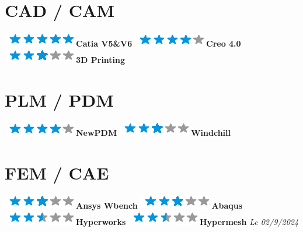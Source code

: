 \documentclass[]{friggeri-cv}
\begin{document}
\begin{aside}
\section{CAD / CAM}
\includegraphics[scale=0.40]{res/img/5stars.png}\hspace{1.5mm}\textbf{Catia V5\&V6}
\includegraphics[scale=0.40]{res/img/4stars.png}\hspace{1.5mm}\textbf{Creo 4.0}
\includegraphics[scale=0.40]{res/img/3stars.png}\hspace{1.5mm}\textbf{3D Printing}\section{PLM / PDM}
\includegraphics[scale=0.40]{res/img/4stars.png}\hspace{1.5mm}\textbf{NewPDM}
\includegraphics[scale=0.40]{res/img/3stars.png}\hspace{1.5mm}\textbf{Windchill}\section{FEM / CAE}
\includegraphics[scale=0.40]{res/img/3stars.png}\hspace{1.5mm}\textbf{Ansys Wbench}
\includegraphics[scale=0.40]{res/img/3stars.png}\hspace{1.5mm}\textbf{Abaqus}
\includegraphics[scale=0.40]{res/img/2-5stars.png}\hspace{1.5mm}\textbf{Hyperworks}
\includegraphics[scale=0.40]{res/img/2-5stars.png}\hspace{1.5mm}\textbf{Hypermesh}
\vspace{2.5mm}%
	\emph{Le 02/9/2024} \hspace*{8mm}
\end{aside}
\end{document}
